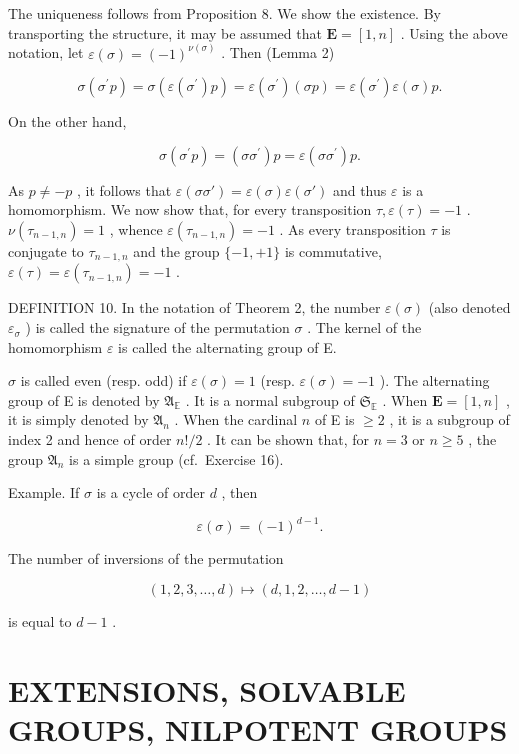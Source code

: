The uniqueness follows from Proposition 8. We show the existence. By transporting the structure, it may be assumed that \(\mathbf{E} = [1, n]\) . Using the above notation, let \(\varepsilon(\sigma) = (-1)^{\nu(\sigma)}\) . Then (Lemma 2)

\[
\sigma (\sigma^ {\prime} p) = \sigma (\varepsilon (\sigma^ {\prime}) p) = \varepsilon (\sigma^ {\prime}) (\sigma p) = \varepsilon (\sigma^ {\prime}) \varepsilon (\sigma) p.
\]

On the other hand,

\[
\sigma (\sigma^ {\prime} p) = (\sigma \sigma^ {\prime}) p = \varepsilon (\sigma \sigma^ {\prime}) p.
\]

As \(p \neq -p\) , it follows that \(\varepsilon(\sigma\sigma') = \varepsilon(\sigma)\varepsilon(\sigma')\) and thus \(\varepsilon\) is a homomorphism. We now show that, for every transposition \(\tau, \varepsilon(\tau) = -1\) . \(\nu(\tau_{n-1,n}) = 1\) , whence \(\varepsilon(\tau_{n-1,n}) = -1\) . As every transposition \(\tau\) is conjugate to \(\tau_{n-1,n}\) and the group \(\{-1, +1\}\) is commutative, \(\varepsilon(\tau) = \varepsilon(\tau_{n-1,n}) = -1\) .

DEFINITION 10. In the notation of Theorem 2, the number \(\varepsilon(\sigma)\) (also denoted \(\varepsilon_{\sigma}\) ) is called the signature of the permutation \(\sigma\) . The kernel of the homomorphism \(\varepsilon\) is called the alternating group of E.

\(\sigma\) is called even (resp. odd) if \(\varepsilon(\sigma) = 1\) (resp. \(\varepsilon(\sigma) = -1\) ). The alternating group of E is denoted by \(\mathfrak{A}_{\mathbb{E}}\) . It is a normal subgroup of \(\mathfrak{S}_{\mathbb{E}}\) . When \(\mathbf{E} = [1, n]\) , it is simply denoted by \(\mathfrak{A}_{n}\) . When the cardinal \(n\) of E is \(\geqslant 2\) , it is a subgroup of index 2 and hence of order \(n! / 2\) . It can be shown that, for \(n = 3\) or \(n \geqslant 5\) , the group \(\mathfrak{A}_{n}\) is a simple group (cf.~Exercise 16).

Example. If \(\sigma\) is a cycle of order \(d\) , then

\[
\varepsilon (\sigma) = (- 1) ^ {d - 1}.
\]

The number of inversions of the permutation

\[
(1, 2, 3, \dots , d) \mapsto (d, 1, 2, \dots , d - 1)
\]

is equal to \(d - 1\) .

\section{EXTENSIONS, SOLVABLE GROUPS, NILPOTENT GROUPS}

